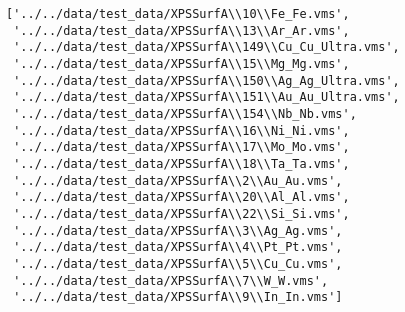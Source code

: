 \begin{lstlisting}
['../../data/test_data/XPSSurfA\\10\\Fe_Fe.vms',
 '../../data/test_data/XPSSurfA\\13\\Ar_Ar.vms',
 '../../data/test_data/XPSSurfA\\149\\Cu_Cu_Ultra.vms',
 '../../data/test_data/XPSSurfA\\15\\Mg_Mg.vms',
 '../../data/test_data/XPSSurfA\\150\\Ag_Ag_Ultra.vms',
 '../../data/test_data/XPSSurfA\\151\\Au_Au_Ultra.vms',
 '../../data/test_data/XPSSurfA\\154\\Nb_Nb.vms',
 '../../data/test_data/XPSSurfA\\16\\Ni_Ni.vms',
 '../../data/test_data/XPSSurfA\\17\\Mo_Mo.vms',
 '../../data/test_data/XPSSurfA\\18\\Ta_Ta.vms',
 '../../data/test_data/XPSSurfA\\2\\Au_Au.vms',
 '../../data/test_data/XPSSurfA\\20\\Al_Al.vms',
 '../../data/test_data/XPSSurfA\\22\\Si_Si.vms',
 '../../data/test_data/XPSSurfA\\3\\Ag_Ag.vms',
 '../../data/test_data/XPSSurfA\\4\\Pt_Pt.vms',
 '../../data/test_data/XPSSurfA\\5\\Cu_Cu.vms',
 '../../data/test_data/XPSSurfA\\7\\W_W.vms',
 '../../data/test_data/XPSSurfA\\9\\In_In.vms']
\end{lstlisting}

